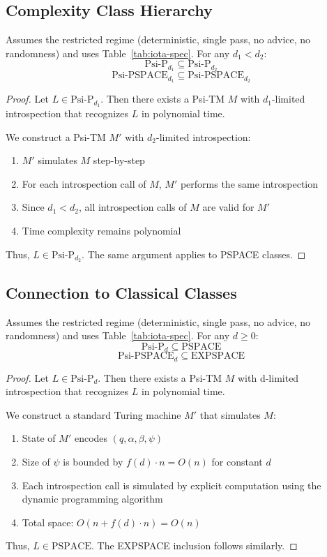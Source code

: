 \subsection{Complexity Class Hierarchy}

\begin{theorem}
Assumes the restricted regime (deterministic, single pass, no advice, no randomness) and uses Table~\ref{tab:iota-spec}.
For any $d_1 < d_2$:
$$\text{Psi-P}_{d_1} \subseteq \text{Psi-P}_{d_2}$$
$$\text{Psi-PSPACE}_{d_1} \subseteq \text{Psi-PSPACE}_{d_2}$$
\end{theorem}

\begin{proof}
Let $L \in \text{Psi-P}_{d_1}$. Then there exists a Psi-TM $M$ with $d_1$-limited introspection that recognizes $L$ in polynomial time.

We construct a Psi-TM $M'$ with $d_2$-limited introspection:
\begin{enumerate}
\item $M'$ simulates $M$ step-by-step
\item For each introspection call of $M$, $M'$ performs the same introspection
\item Since $d_1 < d_2$, all introspection calls of $M$ are valid for $M'$
\item Time complexity remains polynomial
\end{enumerate}

Thus, $L \in \text{Psi-P}_{d_2}$. The same argument applies to PSPACE classes.
\end{proof}

\subsection{Connection to Classical Classes}

\begin{theorem}
Assumes the restricted regime (deterministic, single pass, no advice, no randomness) and uses Table~\ref{tab:iota-spec}.
For any $d \geq 0$:
$$\text{Psi-P}_d \subseteq \text{PSPACE}$$
$$\text{Psi-PSPACE}_d \subseteq \text{EXPSPACE}$$
\end{theorem}

\begin{proof}
Let $L \in \text{Psi-P}_d$. Then there exists a Psi-TM $M$ with d-limited introspection that recognizes $L$ in polynomial time.

We construct a standard Turing machine $M'$ that simulates $M$:
\begin{enumerate}
\item State of $M'$ encodes $(q, \alpha, \beta, \psi)$
\item Size of $\psi$ is bounded by $f(d) \cdot n = O(n)$ for constant $d$
\item Each introspection call is simulated by explicit computation using the dynamic programming algorithm
\item Total space: $O(n + f(d) \cdot n) = O(n)$
\end{enumerate}

Thus, $L \in \text{PSPACE}$. The EXPSPACE inclusion follows similarly.
\end{proof}

